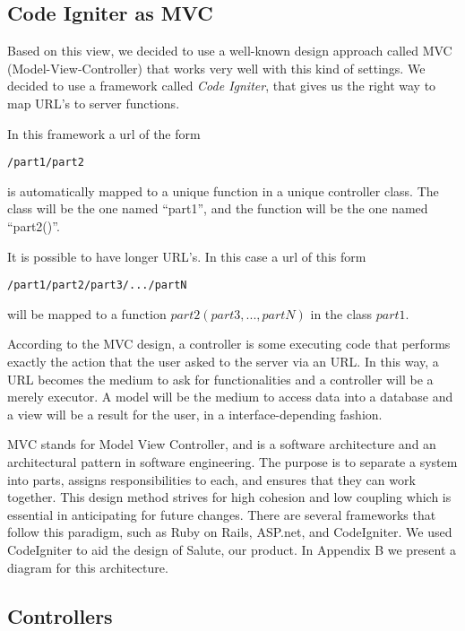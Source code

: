 \subsection{Code Igniter as MVC}
Based on this view, we decided to use a well-known design approach called MVC (Model-View-Controller) that works very well with this kind of settings. We decided to use a framework called \emph{Code Igniter}, that gives us the right way to map URL's to server functions.

In this framework a url of the form
\begin{verbatim}
/part1/part2
\end{verbatim}
is automatically mapped to a unique function in a unique controller class. The class will be the one named ``part1'', and the function will be the one named ``part2()''.

It is possible to have longer URL's. In this case a url of this form
\begin{verbatim}
/part1/part2/part3/.../partN
\end{verbatim}
will be mapped to a function $part2(part3, ..., partN)$ in the class $part1$.

According to the MVC design, a controller is some executing code that performs exactly the action that the user asked to the server via an URL. In this way, a URL becomes the medium to ask for functionalities and a controller will be a merely executor. A model will be the medium to access data into a database and a view will be a result for the user, in a interface-depending fashion.

MVC stands for Model View Controller, and is a software architecture and an architectural pattern in software engineering. The purpose is to separate a system into parts, assigns responsibilities to each, and ensures that they can work together. This design method strives for high cohesion and low coupling which is essential in anticipating for future changes. There are several frameworks that follow this paradigm, such as Ruby on Rails, ASP.net, and CodeIgniter. We used CodeIgniter to aid the design of Salute, our product.  In Appendix B we present a diagram for this architecture.


\subsection{Controllers}

